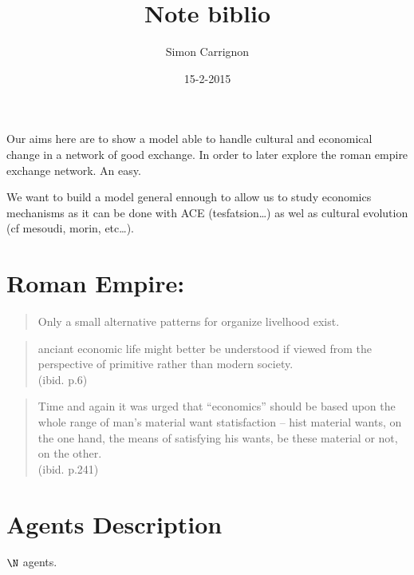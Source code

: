 \documentclass[a4paper]{article}
\title{Note biblio}
\author{Simon Carrignon}
\date{15-2-2015}
\begin{document}
	Our aims here are to show a model able to handle cultural and economical change in a network of good exchange. In order to later explore the roman empire exchange network. An easy.

	We want to build a model general ennough to allow us to study economics mechanisms as it can be done with ACE (tesfatsion\ldots) as wel as cultural evolution (cf mesoudi, morin, etc\ldots). 


	\section{Roman Empire:}
	\begin{quote}
		Only a small alternative patterns for organize livelhood exist.
		\\\cite[introducary notes, p. xviii]{polanyi1957tradeandmarketintheearlyempireseconomiesinhistoryandtheory}
	\end{quote}

	\begin{quote}
		anciant economic life might better be understood if viewed from the perspective of primitive rather than modern society.
		\\(ibid. p.6)
	\end{quote}

	\begin{quote}
		Time and again it was urged that ``economics'' should be based upon the whole range of man's material want statisfaction -- hist material wants, on the one hand, the means of satisfying his wants, be these material or not, on the other.
		\\(ibid. p.241)
	\end{quote}

	\section{Agents Description}
	$\N$ agents.


  
\end{document}
